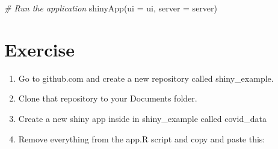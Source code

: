 \documentclass[
]{book}
\newenvironment{Shaded}{\begin{snugshade}}{\end{snugshade}}
\newcommand{\AttributeTok}[1]{\textcolor[rgb]{0.77,0.63,0.00}{#1}}
\newcommand{\CommentTok}[1]{\textcolor[rgb]{0.56,0.35,0.01}{\textit{#1}}}
\newcommand{\FunctionTok}[1]{\textcolor[rgb]{0.00,0.00,0.00}{#1}}
\newcommand{\NormalTok}[1]{#1}
\begin{document}
\begin{Shaded}
\begin{Highlighting}[]
\CommentTok{\# Run the application}
\FunctionTok{shinyApp}\NormalTok{(}\AttributeTok{ui =}\NormalTok{ ui, }\AttributeTok{server =}\NormalTok{ server)}
\end{Highlighting}
\end{Shaded}

\hypertarget{exercise-9}{%
\section*{Exercise}\label{exercise-9}}

\begin{enumerate}
\def\labelenumi{\arabic{enumi})}
\item
  Go to github.com and create a new repository called shiny\_example.
\item
  Clone that repository to your Documents folder.
\item
  Create a new shiny app inside in shiny\_example called covid\_data
\item
  Remove everything from the app.R script and copy and paste this:
\end{enumerate}
\end{document}
